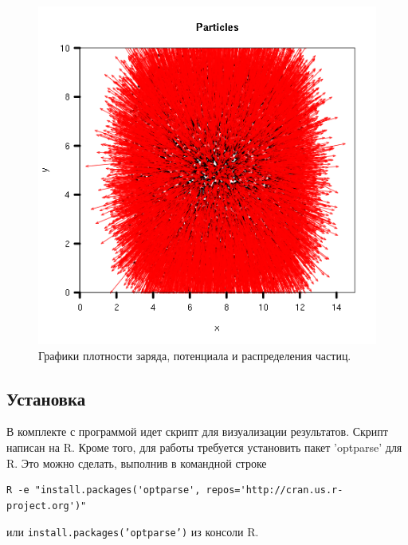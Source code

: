\begin{figure}[h]
  \includegraphics[scale=0.3]{./figs/out0001_particles.png}
  \caption{
    Графики плотности заряда, потенциала и распределения частиц.
  }
\end{figure}

\subsection{ Установка }

В комплекте с программой идет скрипт для визуализации результатов.
Скрипт написан на R. 
Кроме того, для работы требуется установить пакет 'optparse' для R.
Это можно сделать, выполнив в командной строке
\begin{verbatim}
R -e "install.packages('optparse', repos='http://cran.us.r-project.org')"
\end{verbatim}
или \texttt{install.packages('optparse')} из консоли R.


